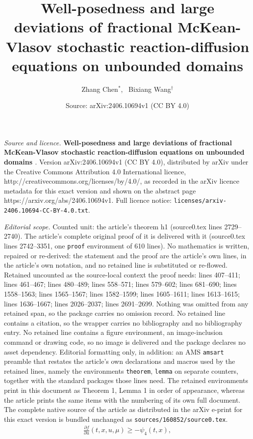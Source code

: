 \documentclass[10pt,a4paper]{amsart}
\title{{\Large \bf{Well-posedness and large deviations of fractional McKean-Vlasov stochastic reaction-diffusion equations on unbounded domains } }}
\author{Zhang Chen$^{\ast}$, \ Bixiang Wang$^{\dagger}$}
\date{Source: arXiv:2406.10694v1 (CC BY 4.0)}
\def\geq{\geqslant}
\begin{document}
\maketitle

\noindent\emph{Source and licence.} {\Large \bf{Well-posedness and large deviations of fractional McKean-Vlasov stochastic reaction-diffusion equations on unbounded domains } }. Version arXiv:2406.10694v1 (CC BY 4.0), distributed by arXiv under the Creative Commons Attribution 4.0 International licence, http://creativecommons.org/licenses/by/4.0/, as recorded in the arXiv licence metadata for this exact version and shown on the abstract page https://arxiv.org/abs/2406.10694v1. Full licence notice: \texttt{licenses/arxiv-2406.10694-CC-BY-4.0.txt}.\par\smallskip

\noindent\textit{Editorial scope.} Counted unit: the article's theorem h1 (source0.tex lines 2729--2740). The article's complete original proof of it is delivered with it (source0.tex lines 2742--3351, one \texttt{proof} environment of 610 lines). No mathematics is written, repaired or re-derived: the statement and the proof are the article's own lines, in the article's own notation, and no retained line is substituted or re-flowed.  Retained uncounted as the source-local context the proof needs: lines 407--411; lines 461--467; lines 480--489; lines 558--571; lines 579--602; lines 681--690; lines 1558--1563; lines 1565--1567; lines 1582--1599; lines 1605--1611; lines 1613--1615; lines 1636--1667; lines 2026--2037; lines 2691--2699.  Nothing was omitted from any retained span, so the package carries no omission record.  No retained line contains a citation, so the wrapper carries no bibliography and no bibliography entry.  No retained line contains a figure environment, an image-inclusion command or drawing code, so no image is delivered and the package declares no asset dependency.  Editorial formatting only, in addition: an AMS \texttt{amsart} preamble that restates the article's own declarations and macros used by the retained lines, namely the environments \texttt{theorem}, \texttt{lemma} on separate counters, together with the standard packages those lines need.  The retained environments print in this document as Theorem 1, Lemma 1 in order of appearance, whereas the article prints the same items with the numbering of its own full document.  The complete native source of the article as distributed in the arXiv e-print for this exact version is bundled unchanged as \texttt{sources/160852/source0.tex}.
\begin{align}\label{f-4}
   \frac{\partial f}{\partial u}
    (t,x,u,\mu)
   \geq - \psi_4(t,x),
\end{align}
\end{document}
